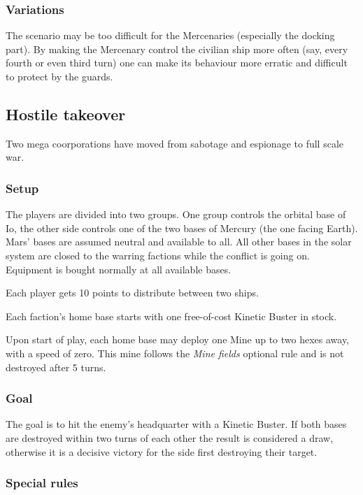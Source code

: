 \documentclass[a4paper,12pt,notitlepage,twocolumn]{article}
\begin{document}
\subsubsection*{Variations}

The scenario may be too difficult for the Mercenaries (especially the
docking part). By making the Mercenary control the civilian ship more
often (say, every fourth or even third turn) one can make its
behaviour more erratic and difficult to protect by the guards. 


\subsection{Hostile takeover}

Two mega coorporations have moved from sabotage and espionage to full
scale war.  

\subsubsection*{Setup}

The players are divided into two groups. One group controls the
orbital base of Io, the other side controls one of the two bases of
Mercury (the one facing Earth). Mars' bases are assumed neutral and
available to all. All other bases in the solar system are closed to
the warring factions while the conflict is going on. Equipment is
bought normally at all available bases. 

Each player gets 10 points to distribute between two ships. 

Each faction's home base starts with one free-of-cost Kinetic Buster in stock. 

Upon start of play, each home base may deploy one Mine up to two hexes
away, with a speed of zero. This mine follows the \emph{Mine fields}
optional rule and is not destroyed after 5 turns. 

\subsubsection*{Goal}

The goal is to hit the enemy's headquarter with a Kinetic Buster. 
If both bases are destroyed within two turns of each other the result
is considered a draw, otherwise it is a decisive victory for the side
first destroying their target.

\subsubsection*{Special rules}
\end{document}
